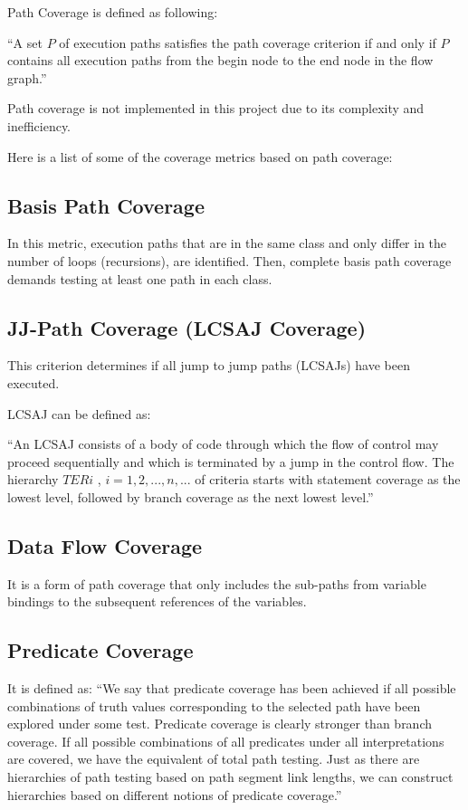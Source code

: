 \documentclass[12pt,a4paper]{report}
\begin{document}
Path Coverage is defined as following:

``A set $P$ of execution paths satisfies the path coverage criterion if and only if $P$ contains all execution paths from the begin node to the end node in the flow graph.''\cite{Zhu:1997:SUT:267580.267590}

Path coverage is not implemented in this project due to its complexity and inefficiency. 

Here is a list of some of the coverage metrics based on path coverage:
\subsection{Basis Path Coverage}
In this metric, execution paths that are in the same class and only differ in the number of loops (recursions), are identified. Then, complete basis path coverage demands testing at least one path in each class.

\subsection{JJ-Path Coverage (LCSAJ Coverage)}
This criterion determines if all jump to jump paths (LCSAJs) have been executed. 

LCSAJ can be defined as:

``An LCSAJ consists of a body of code through which the flow of control may proceed sequentially and which is terminated by a jump in the control flow. The hierarchy $TERi$ , $i = 1, 2, . . . ,n, . . .$ of criteria starts with statement coverage as the lowest level, followed by branch coverage as the next lowest level.''\cite{Zhu:1997:SUT:267580.267590}

\subsection{Data Flow Coverage}
It is a form of path coverage that only includes the sub-paths from variable bindings to the subsequent references of the variables.
 
\subsection{Predicate Coverage}
It is defined as:
``We say that predicate coverage has been achieved if all possible combinations of truth values corresponding to the selected path have been explored under some test. Predicate coverage is clearly stronger than branch coverage. If all possible combinations of all predicates under all interpretations are covered, we have the equivalent of total path testing. Just as there are hierarchies of path testing based on path segment link lengths, we can construct hierarchies based on different notions of predicate coverage.''\cite{beizer2002software}
\end{document}
